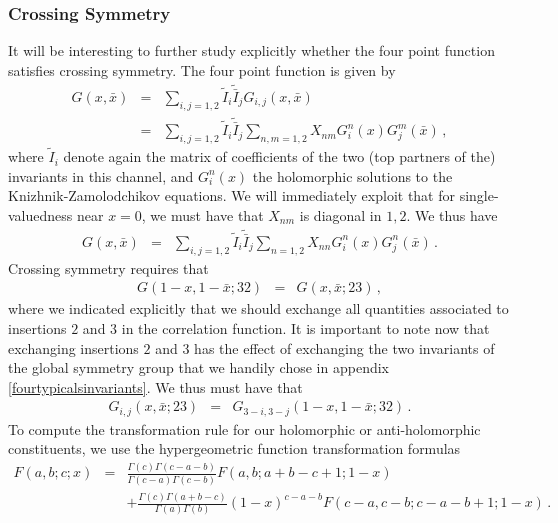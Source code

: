 \documentclass[12pt]{article}
\numberwithin{equation}{section}
\numberwithin{equation}{section}
\numberwithin{table}{section}\setlength{\multlinegap}{25pt}
\begin{document}
\subsubsection{Crossing Symmetry}
It will be interesting to further study explicitly whether the four point function satisfies crossing symmetry.
 The four point function is given by
\begin{eqnarray}
G(x,\bar{x}) &=& \sum_{i,j=1,2} \tilde{I}_i \tilde{\bar{I}}_j G_{i,j}(x,\bar{x})
\nonumber \\
&=& \sum_{i,j=1,2} \tilde{I}_i \tilde{\bar{I}}_j \sum_{n,m=1,2} X_{nm} G_i^n (x) G_j^{m}(\bar{x}) \, ,
\end{eqnarray}
where $\tilde{I}_i$ denote again the matrix of coefficients of the two (top partners of the) invariants in this channel, and $G_i^n(x)$ the holomorphic
solutions to the Knizhnik-Zamolodchikov equations. We will immediately exploit that
for single-valuedness near $x=0$, we must have that $X_{nm}$ is diagonal in $1,2$.
We thus have
\begin{eqnarray}
G(x,\bar{x})%
&=& \sum_{i,j=1,2} \tilde{I}_i \tilde{\bar{I}}_j \sum_{n=1,2} X_{nn} G_i^n (x) G_j^{n}(\bar{x}) \, .
\end{eqnarray}
Crossing symmetry requires that %
\begin{eqnarray}
G(1-x,1-\bar{x};32) &=& G(x,\bar{x};23) \, ,
\end{eqnarray}
where we indicated explicitly that we should exchange all quantities associated to insertions $2$ and $3$ in the
correlation function.
It is important to note now that exchanging insertions $2$ and $3$ has the effect of exchanging the two invariants 
of the global symmetry group that we handily chose in appendix \ref{fourtypicalsinvariants}.
We thus must have that 
\begin{eqnarray}
G_{i,j}(x, \bar{x};23) &=& G_{3-i,3-j}(1-x,1-\bar{x};32) \, . 
\end{eqnarray}
To compute the transformation rule for our holomorphic or anti-holomorphic constituents, 
we use the hypergeometric function transformation formulas
\begin{eqnarray}
F(a,b;c;x) &=& \frac{\Gamma(c) \Gamma(c-a-b)}{\Gamma(c-a) \Gamma(c-b)}
F(a,b;a+b-c+1;1-x)  \\
& & 
+ \frac{\Gamma(c) \Gamma(a+b-c)}{\Gamma(a) \Gamma(b)} (1-x)^{c-a-b}
F(c-a,c-b;c-a-b+1;1-x) \, .\nonumber
\end{eqnarray}
\end{document}
